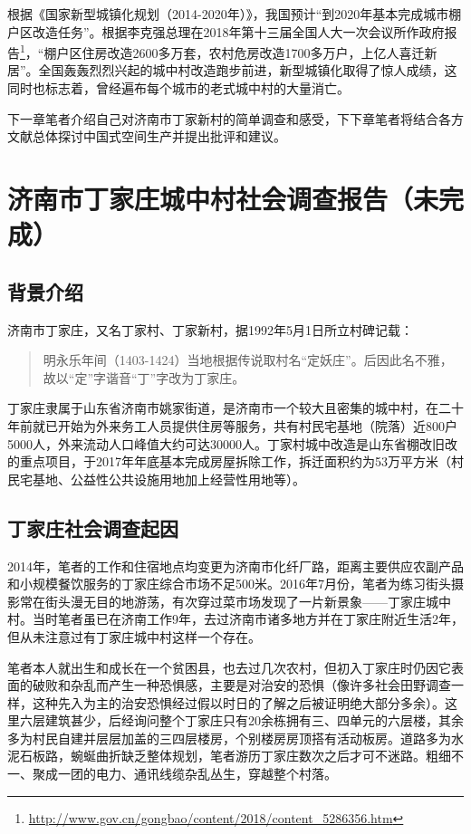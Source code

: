   根据《国家新型城镇化规划（2014-2020年）》，我国预计“到2020年基本完成城市棚户区改造任务”。根据李克强总理在2018年第十三届全国人大一次会议所作政府报告\footnote{\url{http://www.gov.cn/gongbao/content/2018/content_5286356.htm}}，“棚户区住房改造2600多万套，农村危房改造1700多万户，上亿人喜迁新居”。全国轰轰烈烈兴起的城中村改造跑步前进，新型城镇化取得了惊人成绩，这同时也标志着，曾经遍布每个城市的老式城中村的大量消亡。

  下一章笔者介绍自己对济南市丁家新村的简单调查和感受，下下章笔者将结合各方文献总体探讨中国式空间生产并提出批评和建议。


  \chapter{济南市丁家庄城中村社会调查报告（未完成）}

  \section{背景介绍}

  济南市丁家庄，又名丁家村、丁家新村，据1992年5月1日所立村碑记载：
  \begin{quotation}明永乐年间（1403-1424）当地根据传说取村名“定妖庄”。后因此名不雅，故以“定”字谐音“丁”字改为丁家庄。
  \end{quotation}

  丁家庄隶属于山东省济南市姚家街道，是济南市一个较大且密集的城中村，在二十年前就已开始为外来务工人员提供住房等服务，共有村民宅基地（院落）近800户5000人，外来流动人口峰值大约可达30000人。丁家村城中改造是山东省棚改旧改的重点项目，于2017年年底基本完成房屋拆除工作，拆迁面积约为53万平方米（村民宅基地、公益性公共设施用地加上经营性用地等）。

  \section{丁家庄社会调查起因}

  2014年，笔者的工作和住宿地点均变更为济南市化纤厂路，距离主要供应农副产品和小规模餐饮服务的丁家庄综合市场不足500米。2016年7月份，笔者为练习街头摄影常在街头漫无目的地游荡，有次穿过菜市场发现了一片新景象——丁家庄城中村。当时笔者虽已在济南工作9年，去过济南市诸多地方并在丁家庄附近生活2年，但从未注意过有丁家庄城中村这样一个存在。


  笔者本人就出生和成长在一个贫困县，也去过几次农村，但初入丁家庄时仍因它表面的破败和杂乱而产生一种恐惧感，主要是对治安的恐惧（像许多社会田野调查一样，这种先入为主的治安恐惧经过假以时日的了解之后被证明绝大部分多余）。这里六层建筑甚少，后经询问整个丁家庄只有20余栋拥有三、四单元的六层楼，其余多为村民自建并层层加盖的三四层楼房，个别楼房房顶搭有活动板房。道路多为水泥石板路，蜿蜒曲折缺乏整体规划，笔者游历丁家庄数次之后才可不迷路。粗细不一、聚成一团的电力、通讯线缆杂乱丛生，穿越整个村落。


